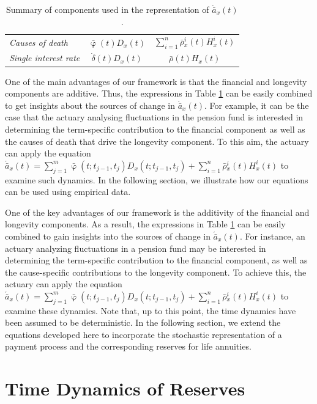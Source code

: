 \documentclass[12pt]{article}
\begin{document}
{\begin{table}[ht]
\begin{tabular}{lcc}
		\textit{Causes of death}&	$\bar{\upvarphi}(t){D}_x(t)$   & $\sum_{i=1}^{n} \bar{\rho}{^i_x}(t){H}^{i}_x(t)$ \\
	
		\textit{Single interest rate}&	$\dot{\delta}(t){D}_x(t)$ & $\bar{\rho}(t){H}_x(t)$  \\
		\bottomrule
	\end{tabular}
	\caption{{Summary of components used in the representation of $\acute{\bar{a}}_x(t)$}.}
	\label{table:Table1}
\end{table}



One of the main advantages of our framework is that the financial and longevity components are additive. Thus, the expressions in Table \ref{table:Table1} can be easily combined to get insights about the sources of change in $\acute{\bar{a}}_x(t)$. For example, it can be the case that the actuary analysing fluctuations in the pension fund is interested in determining the term-specific contribution to the financial component as well as the causes of death that drive the longevity component. To this aim, the actuary can apply the equation $\acute{\bar{a}}_x(t)=\sum_{j=1}^m\bar{\upvarphi}(t;t_{j-1},t_{j}){D}_x(t;t_{j-1},t_{j})+\sum_{i=1}^{n} \bar{\rho}{^i_x}(t){H}^{i}_x(t)$ to examine such dynamics. In the following section, we illustrate how our equations can be used using empirical data.


One of the key advantages of our framework is the additivity of the financial and longevity components. As a result, the expressions in Table \ref{table:Table1} can be easily combined to gain insights into the sources of change in $\acute{\bar{a}}_x(t)$. For instance, an actuary analyzing fluctuations in a pension fund may be interested in determining the term-specific contribution to the financial component, as well as the cause-specific contributions to the longevity component. To achieve this, the actuary can apply the equation 
$\acute{\bar{a}}_x(t)=\sum_{j=1}^m\bar{\upvarphi}(t;t_{j-1},t_{j}){D}_x(t;t_{j-1},t_{j})+\sum_{i=1}^{n} \bar{\rho}{^i_x}(t){H}^{i}_x(t)$ to examine these dynamics. Note that, up to this point, the time dynamics have been assumed to be deterministic. In the following section, we extend the equations developed here to incorporate the stochastic representation of a payment process and the corresponding reserves for life annuities.


\FloatBarrier
\section{Time Dynamics of Reserves}\label{sec:Reserves}


}
\end{document}
